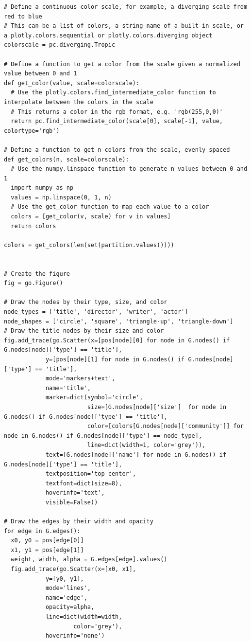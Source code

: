 \begin{tcolorbox}
\begin{verbatim}
# Define a continuous color scale, for example, a diverging scale from red to blue
# This can be a list of colors, a string name of a built-in scale, or a plotly.colors.sequential or plotly.colors.diverging object
colorscale = pc.diverging.Tropic

# Define a function to get a color from the scale given a normalized value between 0 and 1
def get_color(value, scale=colorscale):
  # Use the plotly.colors.find_intermediate_color function to interpolate between the colors in the scale
  # This returns a color in the rgb format, e.g. 'rgb(255,0,0)'
  return pc.find_intermediate_color(scale[0], scale[-1], value, colortype='rgb')

# Define a function to get n colors from the scale, evenly spaced
def get_colors(n, scale=colorscale):
  # Use the numpy.linspace function to generate n values between 0 and 1
  import numpy as np
  values = np.linspace(0, 1, n)
  # Use the get_color function to map each value to a color
  colors = [get_color(v, scale) for v in values]
  return colors

colors = get_colors(len(set(partition.values())))


# Create the figure
fig = go.Figure()

# Draw the nodes by their type, size, and color
node_types = ['title', 'director', 'writer', 'actor']
node_shapes = ['circle', 'square', 'triangle-up', 'triangle-down']
# Draw the title nodes by their size and color
fig.add_trace(go.Scatter(x=[pos[node][0] for node in G.nodes() if G.nodes[node]['type'] == 'title'],
            y=[pos[node][1] for node in G.nodes() if G.nodes[node]['type'] == 'title'],
            mode='markers+text',
            name='title',
            marker=dict(symbol='circle',
                        size=[G.nodes[node]['size']  for node in G.nodes() if G.nodes[node]['type'] == 'title'],
                        color=[colors[G.nodes[node]['community']] for node in G.nodes() if G.nodes[node]['type'] == node_type],
                        line=dict(width=1, color='grey')),
            text=[G.nodes[node]['name'] for node in G.nodes() if G.nodes[node]['type'] == 'title'],
            textposition='top center',
            textfont=dict(size=8),
            hoverinfo='text',
            visible=False))

# Draw the edges by their width and opacity
for edge in G.edges():
  x0, y0 = pos[edge[0]]
  x1, y1 = pos[edge[1]]
  weight, width, alpha = G.edges[edge].values()
  fig.add_trace(go.Scatter(x=[x0, x1],
            y=[y0, y1],
            mode='lines',
            name='edge',
            opacity=alpha,
            line=dict(width=width,
                    color='grey'),
            hoverinfo='none')


\end{verbatim}
\end{tcolorbox}
